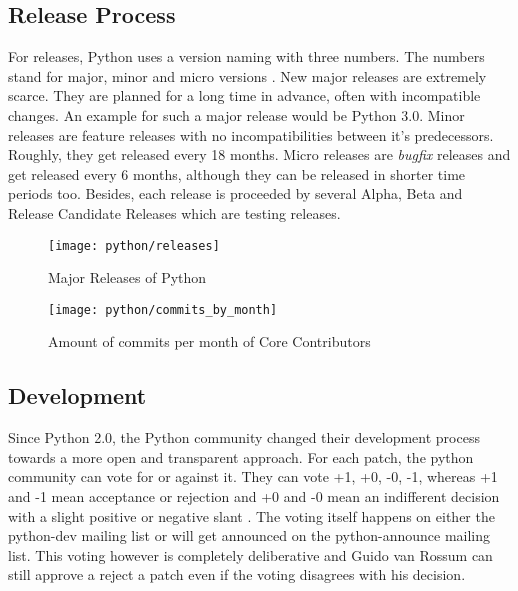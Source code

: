 
\subsection{Release Process} %
\label{sub:Release Process}

For releases, Python uses a version naming with three numbers. The numbers
stand for major, minor and micro versions
\cite{PythonDevelopmentCycle,Warsaw2001}. New major releases are extremely
scarce. They are planned for a long time in advance, often with incompatible
changes. An example for such a major release would be Python 3.0. Minor
releases are feature releases with no incompatibilities between it's
predecessors. Roughly, they get released every 18 months. Micro releases are
\emph{bugfix} releases and get released every 6 months, although they can be
released in shorter time periods too. Besides, each release is proceeded by
several Alpha, Beta and Release Candidate Releases which are testing releases.

\begin{figure}[htbp]
  \centering
  \texttt{[image: python/releases]}
  \caption{Major Releases of Python}
\end{figure}

\begin{figure}[htbp]
  \centering
  \texttt{[image: python/commits\_by\_month]}
  \caption{Amount of commits per month of Core Contributors}
\end{figure}


\subsection{Development} %
\label{sub:Development}

Since Python 2.0, the Python community changed their development process
towards a more open and transparent approach. For each patch, the python
community can vote for or against it. They can vote +1, +0, -0, -1, whereas +1
and -1 mean acceptance or rejection and +0 and -0 mean an indifferent decision
with a slight positive or negative slant \cite{Warsaw2002}. The voting itself
happens on either the python-dev mailing list or will get announced on the
python-announce mailing list. This voting however is completely deliberative
and Guido van Rossum can still approve a reject a patch even if the voting
disagrees with his decision.

